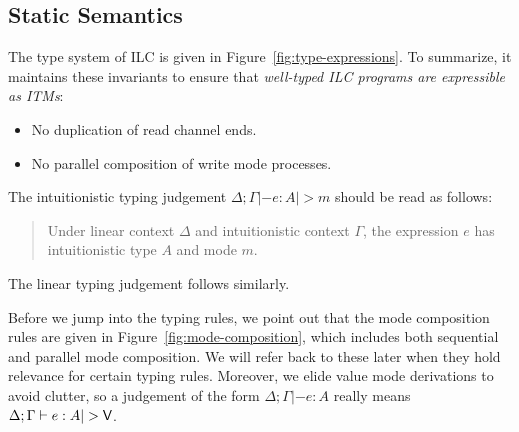%  

\subsection{Static Semantics}
\label{subsec:types}

%





The type system of ILC is given in Figure~\ref{fig:type-expressions}. To
summarize, it maintains these invariants to ensure that \emph{well-typed ILC
  programs are expressible as ITMs}:
\begin{itemize}[leftmargin=*]
  \item No duplication of read channel ends.
  \item No parallel composition of write mode processes.
\end{itemize}

The intuitionistic typing judgement $\Delta ; \Gamma |- e : A |> m$ should be read as
follows:
\begingroup
\addtolength\leftmargini{-.2in}
\begin{quote}
  Under linear context $\Delta$ and intuitionistic context $\Gamma$, the expression $e$
  has intuitionistic type $A$ and mode $m$.
\end{quote}
\endgroup
\noindent The linear typing judgement follows similarly.

Before we jump into the typing rules, we point out that the mode composition
rules are given in Figure~\ref{fig:mode-composition}, which includes both
sequential and parallel mode composition. We will refer back to these later when
they hold relevance for certain typing rules. Moreover, we elide value mode
derivations to avoid clutter, so a judgement of the form $\Delta ; \Gamma |- e : A$ really
means $\Delta ; \Gamma |- e : A |> \Vm$.

